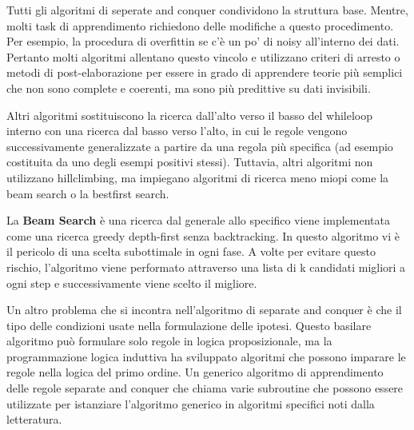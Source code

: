 \documentclass[a4paper]{extarticle}
\begin{document}
Tutti gli algoritmi di seperate and conquer condividono la struttura base. Mentre, molti task di apprendimento richiedono delle modifiche a questo procedimento. Per esempio, la procedura di overfittin se c'è un po' di noisy all'interno dei dati. Pertanto molti algoritmi allentano questo vincolo e utilizzano criteri di arresto o metodi di post-elaborazione per essere in grado di apprendere teorie più semplici che non sono complete e coerenti, ma sono più predittive su dati invisibili.

Altri algoritmi sostituiscono la ricerca dall'alto verso il basso del whileloop interno con una ricerca dal basso verso l'alto, in cui le regole vengono successivamente generalizzate a partire da una regola più specifica (ad esempio costituita da uno degli esempi positivi stessi). Tuttavia, altri algoritmi non utilizzano hillclimbing, ma impiegano algoritmi di ricerca meno miopi come la beam search o la bestfirst search.

La \textbf{Beam Search} è una ricerca dal generale allo specifico viene implementata come una ricerca greedy depth-first senza backtracking. In questo algoritmo vi è il pericolo di una scelta subottimale in ogni fase. A volte per evitare questo rischio, l'algoritmo viene performato attraverso una lista di k candidati migliori a ogni step e successivamente viene scelto il migliore.

Un altro problema che si incontra nell'algoritmo di separate and conquer è che il tipo delle condizioni usate nella formulazione delle ipotesi. Questo basilare algoritmo può formulare solo regole in logica proposizionale, ma la programmazione logica induttiva ha sviluppato algoritmi che possono imparare le regole nella logica del primo ordine. Un generico algoritmo di apprendimento delle regole separate and conquer che chiama varie subroutine che possono essere utilizzate per istanziare l'algoritmo generico in algoritmi specifici noti dalla letteratura.

\begin{center}


\end{center}
\end{document}
